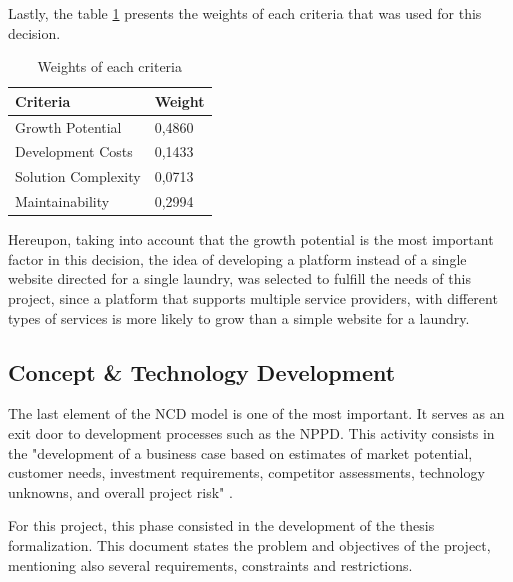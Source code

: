 \par

Lastly, the table \ref{tab:ahpWeights} presents the weights of each criteria that was used for this decision.
\begin{table}[ht]
\centering
\caption[Weights of each criteria]{Weights of each criteria}
\label{tab:ahpWeights}
\begin{tabular}{ll}
\hline
\multicolumn{1}{|l|}{\textbf{Criteria}} & \multicolumn{1}{l|}{\textbf{Weight}} \\ \hline
Growth Potential                                                & 0,4860                                         \\
Development Costs                                               & 0,1433                                         \\
Solution Complexity                                             & 0,0713                                         \\
Maintainability                                                 & 0,2994                                        
\end{tabular}
\end{table}

\par
Hereupon, taking into account that the growth potential is the most important factor in this decision, the idea of developing a platform instead of a single website directed for a single laundry, was selected to fulfill the needs of this project, since a platform that supports multiple service providers, with different types of services is more likely to grow than a simple website for a laundry.

\subsection{Concept \& Technology Development}
The last element of the \gls{NCD} model is one of the most important. It serves as an exit door to development processes such as the \gls{NPPD}. This activity consists in the "development of a
business case based on estimates of market potential,
customer needs, investment requirements, competitor
assessments, technology unknowns, and overall project
risk" \parencite{commonLanguageForFFE}.
\par
For this project, this phase consisted in the development of the thesis formalization. This document states the problem and objectives of the project, mentioning also several requirements, constraints and restrictions.

